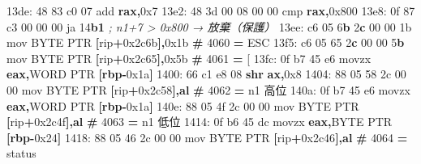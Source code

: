 \documentclass[10pt,a4paper]{article}
\newenvironment{Shaded}{\begin{snugshade}}{\end{snugshade}}
\newcommand{\BaseNTok}[1]{\textcolor[rgb]{0.00,0.00,0.81}{#1}}
\newcommand{\BuiltInTok}[1]{#1}
\newcommand{\CommentTok}[1]{\textcolor[rgb]{0.56,0.35,0.01}{\textit{#1}}}
\newcommand{\DataTypeTok}[1]{\textcolor[rgb]{0.13,0.29,0.53}{#1}}
\newcommand{\DecValTok}[1]{\textcolor[rgb]{0.00,0.00,0.81}{#1}}
\newcommand{\ErrorTok}[1]{\textcolor[rgb]{0.64,0.00,0.00}{\textbf{#1}}}
\newcommand{\KeywordTok}[1]{\textcolor[rgb]{0.13,0.29,0.53}{\textbf{#1}}}
\newcommand{\NormalTok}[1]{#1}
\newcommand{\OperatorTok}[1]{\textcolor[rgb]{0.81,0.36,0.00}{\textbf{#1}}}
\newcommand{\StringTok}[1]{\textcolor[rgb]{0.31,0.60,0.02}{#1}}
\renewenvironment{Shaded}{%
  \def\FrameCommand{\fboxsep=3.2pt\colorbox{shadecolor}}%
  \MakeFramed{\advance\hsize-\width\FrameRestore\small}%
}{%
  \endMakeFramed
}
\begin{document}
\begin{Shaded}
\begin{Highlighting}[]
\NormalTok{13de: 48 83 c0 }\DecValTok{07}\NormalTok{            add    }\KeywordTok{rax}\OperatorTok{,}\BaseNTok{0x7}
\NormalTok{13e2: 48 3d 00 08 00 00      }\BuiltInTok{cmp}    \KeywordTok{rax}\OperatorTok{,}\BaseNTok{0x800}
\NormalTok{13e8: 0f 87 c3 }\DecValTok{00} \DecValTok{00} \DecValTok{00}\NormalTok{      ja     }\DecValTok{14}\ErrorTok{b1}                  \CommentTok{; n1+7 \textgreater{} 0x800 → 放棄（保護）}
\NormalTok{13ee: c6 }\DecValTok{05} \DecValTok{6}\ErrorTok{b} \DecValTok{2}\ErrorTok{c} \DecValTok{00} \DecValTok{00} \BaseNTok{1b}\NormalTok{   mov    }\DataTypeTok{BYTE} \DataTypeTok{PTR} \OperatorTok{[}\NormalTok{rip}\OperatorTok{+}\BaseNTok{0x2c6b}\OperatorTok{],}\BaseNTok{0x1b}   \OperatorTok{\#} \DecValTok{4060} \OperatorTok{=}\NormalTok{ ESC}
\NormalTok{13f5: c6 }\DecValTok{05} \DecValTok{65} \DecValTok{2}\ErrorTok{c} \DecValTok{00} \DecValTok{00} \DecValTok{5}\ErrorTok{b}\NormalTok{   mov    }\DataTypeTok{BYTE} \DataTypeTok{PTR} \OperatorTok{[}\NormalTok{rip}\OperatorTok{+}\BaseNTok{0x2c65}\OperatorTok{],}\BaseNTok{0x5b}   \OperatorTok{\#} \DecValTok{4061} \OperatorTok{=} \StringTok{\textquotesingle{}[\textquotesingle{}}
\NormalTok{13fc: 0f b7 }\DecValTok{45}\NormalTok{ e6            movzx  }\KeywordTok{eax}\OperatorTok{,}\DataTypeTok{WORD} \DataTypeTok{PTR} \OperatorTok{[}\KeywordTok{rbp}\OperatorTok{{-}}\BaseNTok{0x1a}\OperatorTok{]}
\NormalTok{1400: 66 c1 e8 }\DecValTok{08}            \OperatorTok{shr}    \KeywordTok{ax}\OperatorTok{,}\BaseNTok{0x8}
\NormalTok{1404: 88 05 58 2c 00 00      }\BuiltInTok{mov}    \DataTypeTok{BYTE} \DataTypeTok{PTR} \OperatorTok{[}\NormalTok{rip}\OperatorTok{+}\BaseNTok{0x2c58}\OperatorTok{],}\KeywordTok{al}     \OperatorTok{\#} \DecValTok{4062} \OperatorTok{=}\NormalTok{ n1 高位}
\NormalTok{140a: 0f b7 }\DecValTok{45}\NormalTok{ e6            movzx  }\KeywordTok{eax}\OperatorTok{,}\DataTypeTok{WORD} \DataTypeTok{PTR} \OperatorTok{[}\KeywordTok{rbp}\OperatorTok{{-}}\BaseNTok{0x1a}\OperatorTok{]}
\NormalTok{140e: 88 05 4f 2c 00 00      }\BuiltInTok{mov}    \DataTypeTok{BYTE} \DataTypeTok{PTR} \OperatorTok{[}\NormalTok{rip}\OperatorTok{+}\BaseNTok{0x2c4f}\OperatorTok{],}\KeywordTok{al}     \OperatorTok{\#} \DecValTok{4063} \OperatorTok{=}\NormalTok{ n1 低位}
\NormalTok{1414: 0f b6 }\DecValTok{45}\NormalTok{ dc            movzx  }\KeywordTok{eax}\OperatorTok{,}\DataTypeTok{BYTE} \DataTypeTok{PTR} \OperatorTok{[}\KeywordTok{rbp}\OperatorTok{{-}}\BaseNTok{0x24}\OperatorTok{]}
\NormalTok{1418: 88 05 46 2c 00 00      }\BuiltInTok{mov}    \DataTypeTok{BYTE} \DataTypeTok{PTR} \OperatorTok{[}\NormalTok{rip}\OperatorTok{+}\BaseNTok{0x2c46}\OperatorTok{],}\KeywordTok{al}     \OperatorTok{\#} \DecValTok{4064} \OperatorTok{=}\NormalTok{ status}

\end{Highlighting}
\end{Shaded}
\end{document}
